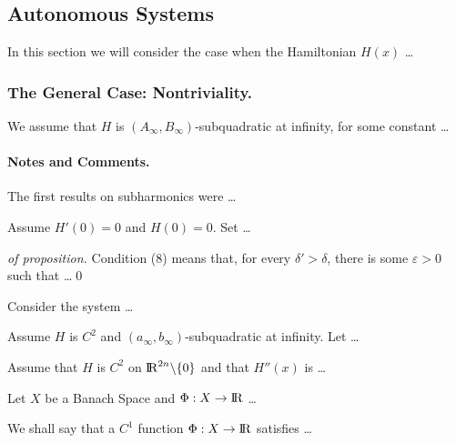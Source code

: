 \documentclass{llncs}
\begin{document}
\subsection{Autonomous Systems}
%
In this section we will consider the case when the Hamiltonian
$H(x)$ \dots
%
\subsubsection*{The General Case: Nontriviality.}
%
We assume that $H$ is
$\left(A_{\infty}, B_{\infty}\right)$-subqua\-dra\-tic
at infinity, for some constant \dots
%
\paragraph{Notes and Comments.}
The first results on subharmonics were \dots
%
\begin{proposition}
Assume $H'(0)=0$ and $ H(0)=0$. Set \dots
\end{proposition}
\begin{proof}[of proposition]
Condition (8) means that, for every $\delta'>\delta$, there is
some $\varepsilon>0$ such that \dots \qed
\end{proof}
%
\begin{example}
Consider the system \dots
\end{example}
\begin{corollary}
Assume $H$ is $C^{2}$ and
$\left(a_{\infty}, b_{\infty}\right)$-subquadratic
at infinity. Let \dots
\end{corollary}
\begin{lemma}
Assume that $H$ is $C^{2}$ on ${\rm I\!R}^{2n}\backslash \{0\}$
and that $H''(x)$ is \dots
\end{lemma}
\begin{theorem}
Let $X$ be a Banach Space and $\Phi:X\to{\rm I\!R}$ \dots
\end{theorem}
\begin{definition}
We shall say that a $C^{1}$ function $\Phi:X\to{\rm I\!R}$
satisfies \dots
\end{definition}
\end{document}
